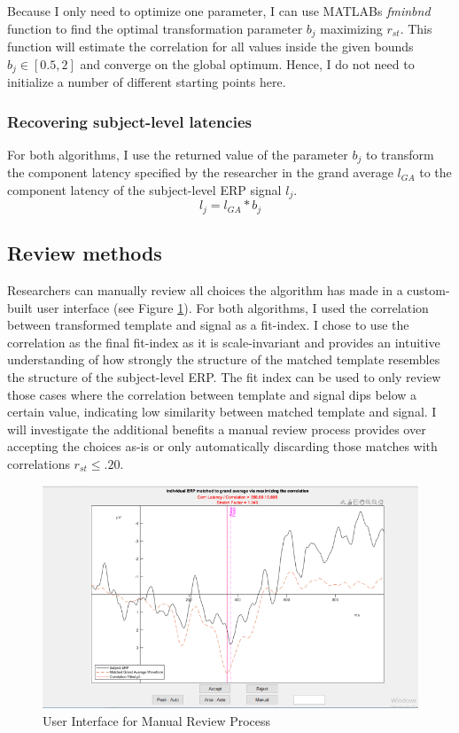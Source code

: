 \documentclass[
  man]{apa7}
\begin{document}
Because I only need to optimize one parameter, I can use MATLABs \emph{fminbnd} function to find the optimal transformation parameter \(b_j\) maximizing \(r_{st}\). This function will estimate the correlation for all values inside the given bounds \(b_j \in [0.5, 2]\) and converge on the global optimum. Hence, I do not need to initialize a number of different starting points here.

\hypertarget{recovering-subject-level-latencies}{%
\subsubsection{Recovering subject-level latencies}\label{recovering-subject-level-latencies}}

For both algorithms, I use the returned value of the parameter \(b_j\) to transform the component latency specified by the researcher in the grand average \(l_{GA}\) to the component latency of the subject-level ERP signal \(l_j\).
\[ l_j = l_{GA} * b_j \]

\hypertarget{review-methods}{%
\subsection{Review methods}\label{review-methods}}

Researchers can manually review all choices the algorithm has made in a custom-built user interface (see Figure \ref{fig:review-gui-example}). For both algorithms, I used the correlation between transformed template and signal as a fit-index. I chose to use the correlation as the final fit-index as it is scale-invariant and provides an intuitive understanding of how strongly the structure of the matched template resembles the structure of the subject-level ERP. The fit index can be used to only review those cases where the correlation between template and signal dips below a certain value, indicating low similarity between matched template and signal. I will investigate the additional benefits a manual review process provides over accepting the choices as-is or only automatically discarding those matches with correlations \(r_{st} \le .20\).



\begin{figure}
\includegraphics[width=0.75\linewidth]{images/review_gui_example} \caption{User Interface for Manual Review Process}\label{fig:review-gui-example}
\end{figure}
\end{document}
